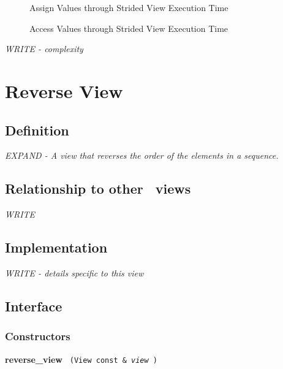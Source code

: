 \begin{figure}[p]
\caption{Assign Values through Strided View Execution Time}
\label{fig:str-vw-assign-exper}
\end{figure}

\begin{figure}[p]
\caption{Access Values through Strided View Execution Time}
\label{fig:str-vw-access-exper}
\end{figure}

\emph{WRITE - complexity}


\section{Reverse View} \label{sec-rev-vw}

\subsection{Definition}

\textit{EXPAND - A view that reverses the order of the elements in a sequence.}

\subsection{Relationship to other \stapl\ views}

\textit{WRITE}

\subsection{Implementation}

\textit{WRITE - details specific to this view}

\subsection{Interface} \label{sec-rev-vw-inter}

\subsubsection{Constructors}

\noindent
\textbf{reverse\_view}%
\texttt{%
(View const \&
\textit{view}%
)
}


